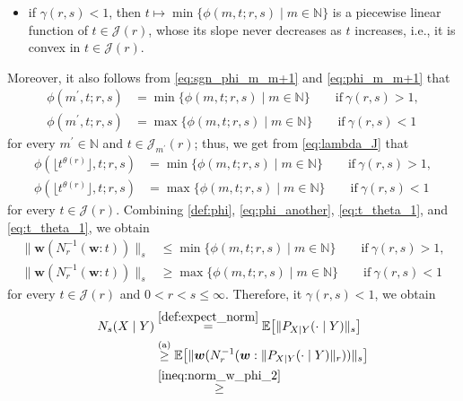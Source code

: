 \documentclass[conference, draftcls, onecolumn]{IEEEtran}
\theoremstyle{plain}
\newcommand{\bvec}[1]{\boldsymbol{#1}}
\newcommand{\thref}[1]{Theorem~\ref{#1}}
\begin{document}
\begin{IEEEproof}[Proof of \thref{th:UV}]
\begin{itemize}
\item
if $\gamma( r, s ) < 1$, then $t \mapsto \min \{ \phi(m, t; r, s) \mid m \in \mathbb{N} \}$ is a piecewise linear function of $t \in \mathcal{J}( r )$, whose its slope never decreases as $t$ increases, i.e., it is convex in $t \in \mathcal{J}( r )$.
\end{itemize}
Moreover, it also follows from \eqref{eq:sgn_phi_m_m+1} and \eqref{eq:phi_m_m+1} that
\begin{align}
\phi( m^{\prime}, t; r, s )
& =
\min \{ \phi(m, t; r, s) \mid m \in \mathbb{N} \}
\qquad \mathrm{if} \ \gamma( r, s ) > 1 ,
\\
\phi( m^{\prime}, t; r, s )
& =
\max \{ \phi(m, t; r, s) \mid m \in \mathbb{N} \}
\qquad \mathrm{if} \ \gamma( r, s ) < 1
\end{align}
for every $m^{\prime} \in \mathbb{N}$ and $t \in \mathcal{J}_{m^{\prime}}( r )$;
thus, we get from \eqref{eq:lambda_J} that
\begin{align}
\phi( \lfloor t^{\theta( r )} \rfloor, t; r, s )
& =
\min \{ \phi(m, t; r, s) \mid m \in \mathbb{N} \}
\qquad \mathrm{if} \ \gamma( r, s ) > 1 ,
\label{eq:t_theta_1} \\
\phi( \lfloor t^{\theta( r )} \rfloor, t; r, s )
& =
\max \{ \phi(m, t; r, s) \mid m \in \mathbb{N} \}
\qquad \mathrm{if} \ \gamma( r, s ) < 1
\label{eq:t_theta_2} 
\end{align}
for every $t \in \mathcal{J}( r )$.
Combining \eqref{def:phi}, \eqref{eq:phi_another}, \eqref{eq:t_theta_1}, and \eqref{eq:t_theta_1}, we obtain
\begin{align}
\| \bvec{w}( N_{r}^{-1}( \bvec{w} : t ) ) \|_{s}
& \le
\min \{ \phi(m, t; r, s) \mid m \in \mathbb{N} \}
\qquad \mathrm{if} \ \gamma(r, s) > 1 ,
\label{ineq:norm_w_phi_1} \\
\| \bvec{w}( N_{r}^{-1}( \bvec{w} : t ) ) \|_{s}
& \ge
\max \{ \phi(m, t; r, s) \mid m \in \mathbb{N} \}
\qquad \mathrm{if} \ \gamma(r, s) < 1
\label{ineq:norm_w_phi_2}
\end{align}
for every $t \in \mathcal{J}( r )$ and $0 < r < s \le \infty$.
Therefore, it $\gamma( r, s ) < 1$, we obtain
\begin{align}
N_{s}(X \mid Y)
& \overset{\eqref{def:expect_norm}}{=}
\mathbb{E} \big[ \| P_{X|Y}(\cdot \mid Y) \|_{s} \big]
\\
& \overset{\text{(a)}}{\ge}
\mathbb{E} \big[ \| \bvec{w}( N_{r}^{-1}( \bvec{w} : \| P_{X|Y}(\cdot \mid Y) \|_{r} ) ) \|_{s} \big]
\\
& \overset{\eqref{ineq:norm_w_phi_2}}{\ge}

\end{align}
\end{IEEEproof}
\end{document}
